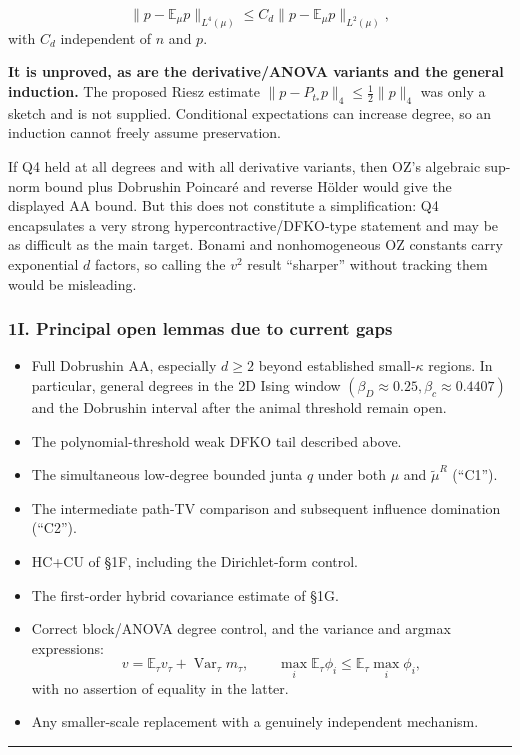 \[\|p-\mathbb E_\mu p\|_{L^4(\mu)}
\le C_d\|p-\mathbb E_\mu p\|_{L^2(\mu)},\]
with \(C_d\) independent of \(n\) and \(p\).

\textbf{It is unproved, as are the derivative/ANOVA variants and the general induction.} The proposed Riesz estimate \(\|p-P_{t_*}p\|_4\le\frac12\|p\|_4\) was only a sketch and is not supplied. Conditional expectations can increase degree, so an induction cannot freely assume preservation.

If Q4 held at all degrees and with all derivative variants, then OZ's algebraic sup-norm bound plus Dobrushin Poincaré and reverse Hölder would give the displayed AA bound. But this does not constitute a simplification: Q4 encapsulates a very strong hypercontractive/DFKO-type statement and may be as difficult as the main target. Bonami and nonhomogeneous OZ constants carry exponential \(d\) factors, so calling the \(v^2\) result ``sharper'' without tracking them would be misleading.

\subsubsection{1I. Principal open lemmas due to current gaps}\label{i.-principal-open-lemmas-due-to-current-gaps}

\begin{itemize}
\tightlist
\item
  Full Dobrushin AA, especially \(d\ge2\) beyond established small-\(\kappa\) regions. In particular, general degrees in the 2D Ising window \((\beta_D\approx0.25,\beta_c\approx0.4407)\) and the Dobrushin interval after the animal threshold remain open.
\item
  The polynomial-threshold weak DFKO tail described above.
\item
  The simultaneous low-degree bounded junta \(q\) under both \(\mu\) and \(\widetilde{\mu}^R\) (``C1'').
\item
  The intermediate path-TV comparison and subsequent influence domination (``C2'').
\item
  HC+CU of §1F, including the Dirichlet-form control.
\item
  The first-order hybrid covariance estimate of §1G.
\item
  Correct block/ANOVA degree control, and the variance and argmax expressions:
  \[v=\mathbb E_\tau v_\tau+\operatorname{Var}_\tau m_\tau,\qquad
  \max_i\mathbb E_\tau\phi_i\le\mathbb E_\tau\max_i\phi_i,\]
  with no assertion of equality in the latter.
\item
  Any smaller-scale replacement with a genuinely independent mechanism.
\end{itemize}

\begin{center}\rule{0.5\linewidth}{0.5pt}\end{center}
